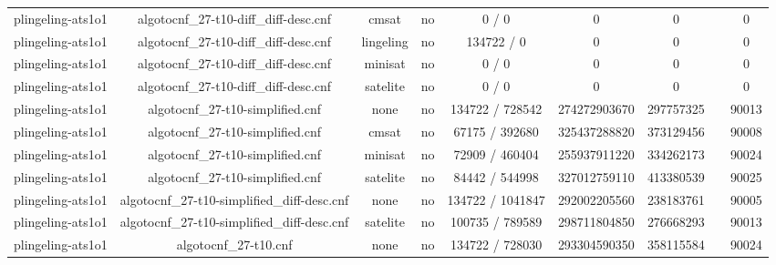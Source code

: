 \begin{appendices}
\begin{table}[p]
\begin{center}
\begin{tabular}{l|cccccccc}
  plingeling-ats1o1              & algotocnf\_27-t10-diff\_diff-desc.cnf & cmsat      & no    & 0 / 0      & 0         & 0         &            & 0 \\ %
  plingeling-ats1o1              & algotocnf\_27-t10-diff\_diff-desc.cnf & lingeling  & no    & 134722 / 0 & 0         & 0         &            & 0 \\ %
  plingeling-ats1o1              & algotocnf\_27-t10-diff\_diff-desc.cnf & minisat    & no    & 0 / 0      & 0         & 0         &            & 0 \\ %
  plingeling-ats1o1              & algotocnf\_27-t10-diff\_diff-desc.cnf & satelite   & no    & 0 / 0      & 0         & 0         &            & 0 \\ %
  plingeling-ats1o1              & algotocnf\_27-t10-simplified.cnf & none       & no    & 134722 / 728542 & 274272903670 & 297757325 &            & 90013 \\ %
  plingeling-ats1o1              & algotocnf\_27-t10-simplified.cnf & cmsat      & no    & 67175 / 392680 & 325437288820 & 373129456 &            & 90008 \\ %
  plingeling-ats1o1              & algotocnf\_27-t10-simplified.cnf & minisat    & no    & 72909 / 460404 & 255937911220 & 334262173 &            & 90024 \\ %
  plingeling-ats1o1              & algotocnf\_27-t10-simplified.cnf & satelite   & no    & 84442 / 544998 & 327012759110 & 413380539 &            & 90025 \\ %
  plingeling-ats1o1              & algotocnf\_27-t10-simplified\_diff-desc.cnf & none       & no    & 134722 / 1041847 & 292002205560 & 238183761 &            & 90005 \\ %
  plingeling-ats1o1              & algotocnf\_27-t10-simplified\_diff-desc.cnf & satelite   & no    & 100735 / 789589 & 298711804850 & 276668293 &            & 90013 \\ %
  plingeling-ats1o1              & algotocnf\_27-t10.cnf          & none       & no    & 134722 / 728030 & 293304590350 & 358115584 &            & 90024 \\ %

\end{tabular}
\end{center}
\end{table}
\end{appendices}
